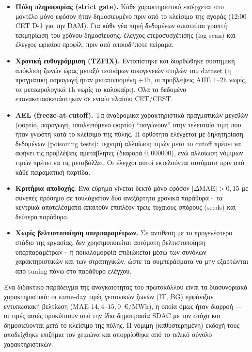 \begin{itemize}
  \item \textbf{Πύλη πληροφορίας (strict gate).} Κάθε χαρακτηριστικό εισέρχεται στο
        μοντέλο μόνο εφόσον ήταν δημοσιευμένο πριν από το κλείσιμο της αγοράς
        (12:00 CET D-1 για την DAM). Για κάθε νέα πηγή δεδομένων απαιτείται γραπτή
        τεκμηρίωση του χρόνου δημοσίευσης, έλεγχος ετεροσυσχέτισης (lag-scan) και
        έλεγχος ωριαίου προφίλ, πριν από οποιοδήποτε πείραμα.
  \item \textbf{Χρονική ευθυγράμμιση (TZFIX).} Εντοπίστηκε και διορθώθηκε συστημική
        απόκλιση ζωνών ώρας μεταξύ τεσσάρων οικογενειών στηλών του dataset (η
        πραγματική παραγωγή ήταν μετατοπισμένη $+1$h, οι προβλέψεις ΑΠΕ $1$--$2$h
        νωρίς, τα μετεωρολογικά $1$h νωρίς το καλοκαίρι). Όλα τα δεδομένα
        επανακατασκευάστηκαν σε ενιαίο πλαίσιο CET/CEST.
  \item \textbf{AEL (freeze-at-cutoff).} Τα αναδρομικά χαρακτηριστικά πραγματικών
        μεγεθών (φορτίο, παραγωγή, υπολειπόμενο φορτίο) ``παγώνουν'' στην τελευταία
        τιμή που ήταν γνωστή κατά το κλείσιμο της πύλης. Η ορθότητα ελέγχεται με
        δηλητηρίαση δεδομένων (poisoning tests): τεχνητή αλλοίωση τιμών μετά το
        cutoff πρέπει να αφήνει τις προβλέψεις αμετάβλητες (διαφορά $0{,}000000$),
        ενώ αλλοίωση νόμιμων τιμών πρέπει να τις μεταβάλλει. Οι έλεγχοι αυτοί
        εκτελούνται αυτόματα πριν από κάθε πειραματική παρτίδα.
  \item \textbf{Κριτήρια αποδοχής.} Ένα εύρημα γίνεται δεκτό μόνο εφόσον
        $|\Delta \mathrm{MAE}| > 0{,}15$ με συνεπές πρόσημο σε τουλάχιστον δύο
        ανεξάρτητα χρονικά παράθυρα· τα κεντρικά αποτελέσματα απαιτούν επιπλέον
        τρεις τυχαίους σπόρους (seeds) και δεύτερο παράθυρο.
  \item \textbf{Χωρίς βελτιστοποίηση υπερπαραμέτρων.} Σε αντίθεση με το προγενέστερο
        στάδιο της εργασίας, δεν χρησιμοποιείται αυτόματη βελτιστοποίηση
        υπερπαραμέτρων· η ποικιλομορφία επιδιώκεται μέσω των συνόλων χαρακτηριστικών
        και των στρατηγικών, ώστε τα συμπεράσματα να μην εξαρτώνται από tuning
        πάνω στο παράθυρο ελέγχου.
\end{itemize}

Ένα διδακτικό παράδειγμα της αναγκαιότητας του πρωτοκόλλου είναι τα διασυνοριακά
χαρακτηριστικά: οι same-day τιμές γειτονικών ζωνών (IT, BG) εμφάνιζαν εντυπωσιακή
βελτίωση (MAE $14{,}4$--$15{,}0$~€/MWh), η οποία όμως ήταν διαρροή --- οι τιμές
αυτές προκύπτουν από την ίδια δημοπρασία SDAC με τον στόχο και δημοσιεύονται
\emph{μετά} το κλείσιμο της πύλης. Η νόμιμη (καθυστερημένη) εκδοχή τους
αποδείχθηκε επιζήμια τον χειμώνα και απορρίφθηκε από το τελικό σύνολο
χαρακτηριστικών.

